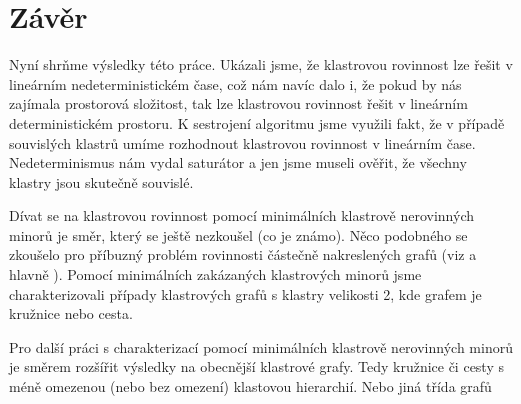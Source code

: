 \documentclass[12pt,a4report]{report}
\begin{document}
\author{Filip Šedivý}

\chapter{Závěr}

Nyní shrňme výsledky této práce. Ukázali jsme, že klastrovou rovinnost lze řešit v lineárním nedeterministickém čase, což nám navíc dalo i, že pokud by nás zajímala prostorová složitost, tak lze klastrovou rovinnost řešit v lineárním deterministickém prostoru.  K sestrojení algoritmu jsme využili fakt, že v případě souvislých klastrů umíme rozhodnout klastrovou rovinnost v lineárním čase. Nedeterminismus nám vydal saturátor a jen jsme museli ověřit, že všechny klastry jsou skutečně souvislé.

Dívat se na klastrovou rovinnost pomocí minimálních klastrově nerovinných minorů je směr, který se ještě nezkoušel (co je známo). Něco podobného se zkoušelo pro příbuzný problém rovinnosti částečně nakreslených grafů (viz \cite{AngeliniEtAl10} a hlavně \cite{JelinekEtAl10}). Pomocí minimálních zakázaných klastrových minorů jsme charakterizovali případy klastrových grafů s klastry velikosti 2, kde grafem je kružnice nebo cesta.

Pro další práci s charakterizací pomocí minimálních klastrově nerovinných minorů je směrem rozšířit výsledky na obecnější klastrové grafy.  Tedy kružnice či cesty s méně omezenou (nebo bez omezení) klastovou hierarchií. Nebo jiná třída grafů
\end{document}
